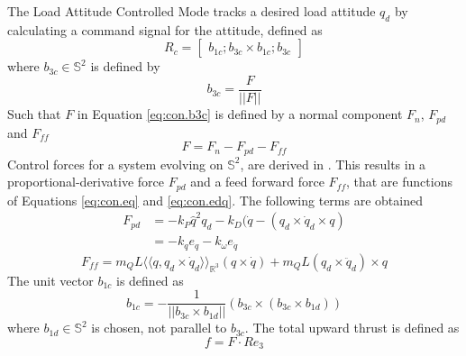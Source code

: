 

The Load Attitude Controlled Mode tracks a desired load attitude $ q_d $ by calculating a command signal for the  attitude, defined as
\begin{equation}\label{eq:con.R}
R_c = \begin{bmatrix}
b_{1c}; b_{3c}\times b_{1c};b_{3c}
\end{bmatrix}
\end{equation}
where $ b_{3c} \in \mathbb{S}^2 $ is defined by 
\begin{equation}\label{eq:con.b3c}
b_{3c}=\frac{F}{||F||}
\end{equation}
Such that $ F $ in Equation \ref{eq:con.b3c} is defined by a normal component $ F_n $, $ F_{pd} $ and $ F_{ff}$
\begin{equation}\label{key}
F=F_n-F_{pd}-F_{ff}
\end{equation}
 Control forces for a system evolving on $ \mathbb{S}^2 $, are derived in \cite{Bullo2005}. 
 This results in a proportional-derivative force $ F_{pd} $ and a feed forward force $ F_{ff} $, that are functions of Equations \ref{eq:con.eq} and \ref{eq:con.edq}. The following terms are obtained
\begin{equation}\label{key}
\begin{aligned}
F_{pd}&=-k_P\hat{q}^2q_d-k_D(\dot{q}-(q_d\times\dot{q}_d\times q)\\
&=-k_qe_q-k_\omega e_{\dot{q}}
\end{aligned}
\end{equation}
\begin{equation}\label{key}
F_{ff}=m_QL\langle\langle q,q_d\times\dot{q}_d\rangle\rangle_{\mathbb{R}^3}(q\times \dot{q})+m_QL(q_d\times \ddot{q}_d)\times q
\end{equation}
The unit vector $ b_{1c} $ is defined as \cite{Lee2010d}
\begin{equation}\label{key}
b_{1c}=-\frac{1}{||b_{3c}\times b_{1d}||}(b_{3c}\times(b_{3c}\times b_{1d}))
\end{equation}
where $ b_{1d}\in \mathbb{S}^2 $ is chosen, not parallel to $ b_{3c} $.
The total upward thrust is defined as
\begin{equation}\label{key}
f=F\cdot Re_3
\end{equation}

